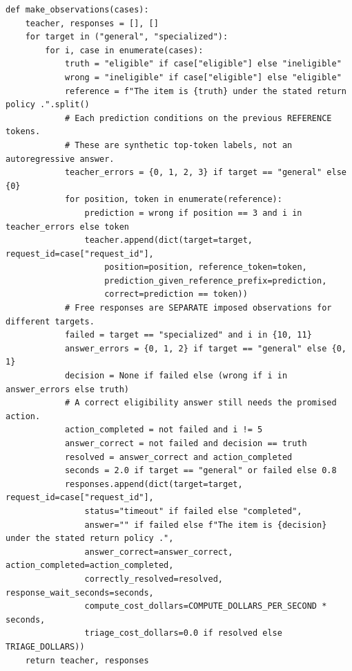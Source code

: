 \begin{Verbatim}[breaklines,breakanywhere,fontsize=\small]
def make_observations(cases):
    teacher, responses = [], []
    for target in ("general", "specialized"):
        for i, case in enumerate(cases):
            truth = "eligible" if case["eligible"] else "ineligible"
            wrong = "ineligible" if case["eligible"] else "eligible"
            reference = f"The item is {truth} under the stated return policy .".split()
            # Each prediction conditions on the previous REFERENCE tokens.
            # These are synthetic top-token labels, not an autoregressive answer.
            teacher_errors = {0, 1, 2, 3} if target == "general" else {0}
            for position, token in enumerate(reference):
                prediction = wrong if position == 3 and i in teacher_errors else token
                teacher.append(dict(target=target, request_id=case["request_id"],
                    position=position, reference_token=token,
                    prediction_given_reference_prefix=prediction,
                    correct=prediction == token))
            # Free responses are SEPARATE imposed observations for different targets.
            failed = target == "specialized" and i in {10, 11}
            answer_errors = {0, 1, 2} if target == "general" else {0, 1}
            decision = None if failed else (wrong if i in answer_errors else truth)
            # A correct eligibility answer still needs the promised action.
            action_completed = not failed and i != 5
            answer_correct = not failed and decision == truth
            resolved = answer_correct and action_completed
            seconds = 2.0 if target == "general" or failed else 0.8
            responses.append(dict(target=target, request_id=case["request_id"],
                status="timeout" if failed else "completed",
                answer="" if failed else f"The item is {decision} under the stated return policy .",
                answer_correct=answer_correct, action_completed=action_completed,
                correctly_resolved=resolved, response_wait_seconds=seconds,
                compute_cost_dollars=COMPUTE_DOLLARS_PER_SECOND * seconds,
                triage_cost_dollars=0.0 if resolved else TRIAGE_DOLLARS))
    return teacher, responses



\end{Verbatim}
